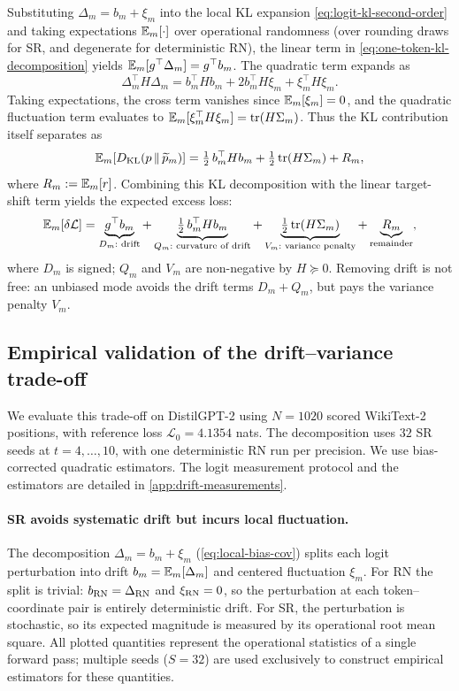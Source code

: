 Substituting $\Delta_m=b_m+\xi_m$ into the local KL expansion
\cref{eq:logit-kl-second-order} and taking expectations $\mathbb{E}_m[\cdot]$ over
operational randomness (over rounding draws for SR, and degenerate for
deterministic RN), the linear term in \cref{eq:one-token-kl-decomposition} yields
$\mathbb{E}_m[g^\top\Delta_m]=g^\top b_m$.
The quadratic term expands as
\begin{equation*}
  \Delta_m^\top H\Delta_m
  =b_m^\top Hb_m + 2b_m^\top H\xi_m + \xi_m^\top H\xi_m.
\end{equation*}
Taking expectations, the cross term vanishes since $\mathbb{E}_m[\xi_m]=0$, and the
quadratic fluctuation term evaluates to $\mathbb{E}_m[\xi_m^\top H\xi_m] = \operatorname{tr}(H\Sigma_m)$.
Thus the KL contribution itself separates as
\begin{equation*}
  \mathbb{E}_m[D_{\mathrm{KL}}(p\,\|\,\widetilde p_m)]
  =\tfrac12\,b_m^\top Hb_m +\tfrac12\operatorname{tr}(H\Sigma_m) +R_m,
\end{equation*}
where $R_m:=\mathbb{E}_m[r]$.  Combining this KL decomposition with the linear
target-shift term yields the expected excess loss:
\begin{equation}
  \mathbb{E}_m[\delta\mathcal L]
  =\underbrace{g^\top b_m}_{D_m:\text{ drift}}
  +\underbrace{\tfrac12\,b_m^\top Hb_m}_{Q_m:\text{ curvature of drift}}
  +\underbrace{\tfrac12\operatorname{tr}(H\Sigma_m)}_{V_m:\text{ variance penalty}}
  +\underbrace{R_m}_{\text{remainder}},
  \label{eq:head-full-comparison}
\end{equation}
where $D_m$ is signed; $Q_m$ and $V_m$ are non-negative by $H\succeq0$.
Removing drift is not free: an unbiased mode avoids the drift terms $D_m+Q_m$,
but pays the variance penalty $V_m$.

\subsection{Empirical validation of the drift--variance trade-off}
\label{sec:analysis-empirical-drift}

We evaluate this trade-off on DistilGPT-2 using $N=1020$ scored WikiText-2
positions, with reference loss $\mathcal L_0=4.1354$ nats.
The decomposition uses $32$ SR seeds at $t=4,\ldots,10$, with one
deterministic RN run per precision. We use bias-corrected quadratic
estimators.  The logit measurement protocol and the estimators are detailed in \cref{app:drift-measurements}.

\paragraph{SR avoids systematic drift but incurs local fluctuation.}
The decomposition $\Delta_m = b_m + \xi_m$ (\cref{eq:local-bias-cov})
splits each logit perturbation into drift $b_m = \mathbb{E}_m[\Delta_m]$ and centered
fluctuation $\xi_m$. For RN the split is trivial: $b_{\mathrm{RN}} = \Delta_{\mathrm{RN}}$
and $\xi_{\mathrm{RN}} = 0$, so the perturbation at each token--coordinate pair is
entirely deterministic drift. For SR, the perturbation is stochastic,
so its expected magnitude is measured by its operational root mean square.
All plotted quantities represent the operational statistics of a
single forward pass; multiple seeds ($S=32$) are used exclusively to construct
empirical estimators for these quantities.

